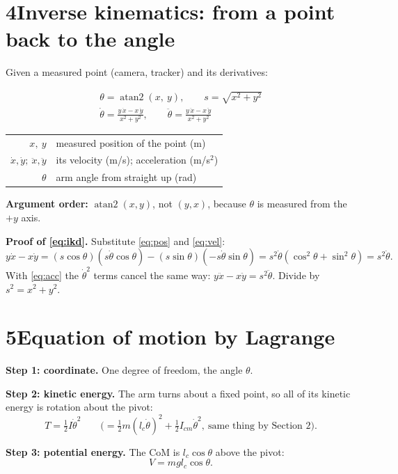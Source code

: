 \documentclass[11pt]{article}
\makeatletter
\newcommand{\where}[1]{\par\vspace{-2pt}{\small\color{muted}\textit{where}}\par\vspace{-2pt}
  {\small\renewcommand{\arraystretch}{1.08}\begin{tabular}{@{}>{$}r<{$}@{\;\;}l@{}}#1\end{tabular}}}
\makeatother
\begin{document}
\section*{4\quad Inverse kinematics: from a point back to the angle}
Given a measured point (camera, tracker) and its derivatives:
\begin{result}
\begin{gather}
\theta = \operatorname{atan2}(x,\ y),\qquad s=\sqrt{x^2+y^2} \label{eq:ik}\\[2pt]
\dot\theta = \frac{y\,\dot x - x\,\dot y}{x^2+y^2},\qquad
\ddot\theta = \frac{y\,\ddot x - x\,\ddot y}{x^2+y^2} \label{eq:ikd}
\end{gather}
\where{x,\ y & measured position of the point (m)\\ \dot x,\dot y;\ \ddot x,\ddot y & its velocity (m/s); acceleration (m/s$^2$)\\ \theta & arm angle from straight up (rad)}
\end{result}
\textbf{Argument order:} $\operatorname{atan2}(x,y)$, not $(y,x)$, because $\theta$ is measured from the $+y$ axis.

\textbf{Proof of \eqref{eq:ikd}.} Substitute \eqref{eq:pos} and \eqref{eq:vel}:
\begin{equation*}
y\dot x - x\dot y = (s\cos\theta)(s\dot\theta\cos\theta)-(s\sin\theta)(-s\dot\theta\sin\theta)=s^2\dot\theta(\cos^2\theta+\sin^2\theta)=s^2\dot\theta .
\end{equation*}
With \eqref{eq:acc} the $\dot\theta^2$ terms cancel the same way: $y\ddot x-x\ddot y=s^2\ddot\theta$. Divide by $s^2=x^2+y^2$.

\section*{5\quad Equation of motion by Lagrange}
\textbf{Step 1: coordinate.} One degree of freedom, the angle $\theta$.

\textbf{Step 2: kinetic energy.} The arm turns about a fixed point, so all of its kinetic energy is rotation about the pivot:
\begin{equation}
T=\tfrac12 I\dot\theta^2 \qquad\Big(=\tfrac12 m (l_c\dot\theta)^2+\tfrac12 I_{cm}\dot\theta^2,\ \text{same thing by Section 2}\Big).
\end{equation}

\textbf{Step 3: potential energy.} The CoM is $l_c\cos\theta$ above the pivot:
\begin{equation}
V = m g l_c\cos\theta .
\end{equation}
\end{document}
